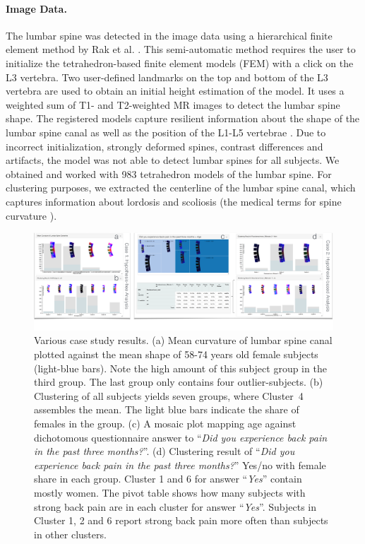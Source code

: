 \documentclass[journal]{style/vgtc} 			          %
\begin{document}
\paragraph{Image Data.} \label{Image-Data}
The lumbar spine was detected in the image data using a hierarchical finite element method by Rak et al. \cite{Rak2013}.
%
This semi-automatic method requires the user to initialize the tetrahedron-based finite element models (FEM) with a click on the L3 vertebra.
%
Two user-defined landmarks on the top and bottom of the L3 vertebra are used to obtain an initial height estimation of the model.
%
It uses a weighted sum of T1- and T2-weighted MR images to detect the lumbar spine shape.
%
The registered models capture resilient information about the shape of the lumbar spine canal as well as the position of the L1-L5 vertebrae \cite{Klemm2013VMV}.
%
Due to incorrect initialization, strongly deformed spines, contrast differences and artifacts, the model was not able to detect lumbar spines for all subjects.
%
We obtained and worked with 983 tetrahedron models of the lumbar spine.
%
For clustering purposes, we extracted the centerline of the lumbar spine canal, which captures information about lordosis and scoliosis (the medical terms for spine curvature \cite{Klemm2013VMV}).

\begin{figure}[htb]
 \centering
 \includegraphics[width=1\textwidth, resolution=300]{figures/evaluation}
 \caption{Various case study results.
 (a) Mean curvature of lumbar spine canal plotted against the mean shape of 58-74 years old female subjects (light-blue bars).
 Note the high amount of this subject group in the third group. The last group only contains four outlier-subjects.
 (b) Clustering of all subjects yields seven groups, where Cluster~4 assembles the mean. The light blue bars indicate the share of females in the group.
 (c) A mosaic plot mapping age against dichotomous questionnaire answer to ``\emph{Did you experience back pain in the past three months?}''.
 (d) Clustering result of ``\emph{Did you experience back pain in the past three months?}'' Yes/no with female share in each group. 
 Cluster 1 and 6 for answer ``\emph{Yes}'' contain mostly women.
 The pivot table shows how many subjects with strong back pain are in each cluster for answer ``\emph{Yes}''.
 Subjects in Cluster 1, 2 and 6 report strong back pain more often than subjects in other clusters.
 }
 \label{fig:application}
\end{figure}
\end{document}
